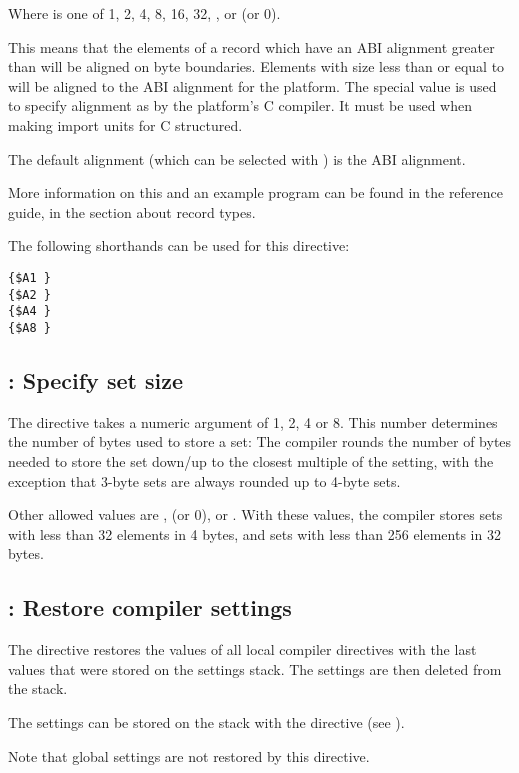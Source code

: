 Where  is one of 1, 2, 4, 8, 16, 32, ,  or  (or 0).

This means that the elements of a record which have an ABI alignment greater than 
will be aligned on  byte boundaries. 
Elements with size less than or equal to  will be aligned to the ABI alignment for the platform.
The special value   is used to specify alignment as by the platform's C compiler. 
It must be used when making import units for C structured.

The default alignment (which can be selected with ) is the ABI
alignment.

More information on this and an example program can be found in the reference
guide, in the section about record types.

The following shorthands can be used for this directive:
\begin{verbatim}
{$A1 }
{$A2 }
{$A4 }
{$A8 }
\end{verbatim}

\subsection{ : Specify set size}
\label{se:Packset}
The  directive takes a numeric argument of 1, 2, 4 or 8.
This number determines the number of bytes used to store a set: 
The compiler rounds the number of bytes needed to store the set 
down/up to the closest multiple of the  setting, 
with the exception that 3-byte sets are always rounded up to 4-byte 
sets.

Other allowed values are ,  (or 0), or . 
With these values, the compiler stores sets with less than 32 elements 
in 4 bytes, and sets with less than 256 elements in 32 bytes. 


\subsection{ : Restore compiler settings}
\label{se:Pop}
The  directive restores the values of all local compiler
directives with the last values that were stored on the settings stack. 
The settings are then deleted from the stack.

The settings can be stored on the stack with the  directive
(see ).

Note that global settings are not restored by this directive.

